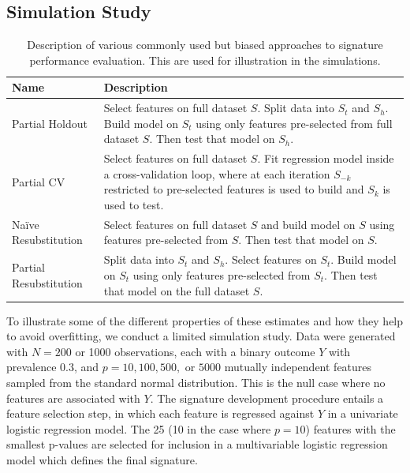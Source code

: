 \documentclass[11pt,]{article}
\begin{document}
\subsection{Simulation Study}\label{simulation-study}

\begin{table}
\caption{Description of various commonly used but biased approaches to signature performance evaluation. This are used for illustration in the simulations. \label{descript} }
\begin{center}
\begin{tabular}[!ht]{l|p{3in}}
Name & Description \\
\hline
Partial Holdout & Select features on full dataset $S$. Split data into $S_t$ and $S_h$. Build model on $S_t$ using only features pre-selected from full dataset $S$. Then test that model on $S_h$. \\
Partial CV  & Select features on full dataset $S$. Fit regression model inside a cross-validation loop, where at each iteration $S_{-k}$ restricted to pre-selected features is used to build and $S_k$ is used to test. \\
Naïve Resubstitution & Select features on full dataset $S$ and build model on $S$ using features pre-selected from $S$. Then test that model on $S$. \\
Partial Resubstitution & Split data into $S_t$ and $S_h$. Select features on $S_t$. Build model on $S_t$ using only features pre-selected from $S_t$. Then test that model on the full dataset $S$. \\
\end{tabular}
\end{center}
\end{table}

To illustrate some of the different properties of these estimates and
how they help to avoid overfitting, we conduct a limited simulation
study. Data were generated with \(N = 200\) or 1000 observations, each
with a binary outcome \(Y\) with prevalence 0.3, and
\(p = 10, 100, 500,\) or \(5000\) mutually independent features sampled
from the standard normal distribution. This is the null case where no
features are associated with \(Y\). The signature development procedure
entails a feature selection step, in which each feature is regressed
against \(Y\) in a univariate logistic regression model. The 25 (10 in
the case where \(p = 10\)) features with the smallest p-values are
selected for inclusion in a multivariable logistic regression model
which defines the final signature.
\end{document}
